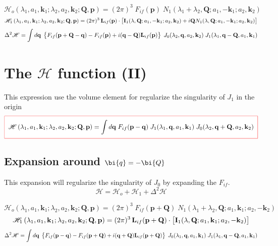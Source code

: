 \begin{equation}\label{Q:Hb}
\mathcal{H}_{o} \left( \lambda_{1},a_{1},\bm{k}_{1} ; \lambda_{2},
a_{2}, \bm{k}_{2} ; \bm{Q}, \bm{p} \right) = (2 \pi)^{3} \;
F_{if}(\bm{p}) \; N_{1} \left(\lambda_{1}+\lambda_{2}, \bm{Q} ; a_{1},
- \bm{k}_{1} ; a_{2}, \bm{k}_{2} \right)
\end{equation}
%
\[
\mathcal{H}_{1}\left( \lambda_{1},a_{1},\bm{k}_{1} ; \lambda_{2},
a_{2}, \bm{k}_{2}; \bm{Q}, \bm{p} \right)= (2 \pi)^{3} \, \bm{L}_{if}
(\bm{p}) \cdot  \left[ \bm{I}_{1}(\lambda,\bm{Q}; a_{1}, -\bm{k}_{1};
a_{2}, \bm{k}_{2} ) + i \bm{Q} N_{1}(\lambda,\bm{Q} ;
a_{1},-\bm{k}_{1} ; a_{2},\bm{k}_{2}) \vstretch \right]
\]
%
\[
\Delta^{2} \mathcal{H} = \int d \bm{q} \; \left\{ F_{if}( \bm{p} +
\bm{Q} - \bm{q} ) - F_{if}(\bm{p}) + i (\bm{q}-\bm{Q})
\bm{L}_{if}(\bm{p}) \vstretch\right\} \;
 J_{0}( \lambda_{2}, \bm{q} , a_{2}, \bm{k}_{2} ) \;
 J_{1}( \lambda_{1}, \bm{q} - \bm{Q}, a_{1}, \bm{k}_{1} )
\]

\section{The $\mathcal{H}$ function (II)}
This expression use the volume element for regularize the singularity
of $J_{1}$ in the origin
%
\[
  \fbeq{
\mathcal{H} \left( \lambda_{1},a_{1},\bm{k}_{1} ; \lambda_{2},a_{2},
\bm{k}_{2}; \bm{Q}, \bm{p} \right) = \int d \bm{q} \; F_{if}( \bm{p}
- \bm{q} ) \;
 J_{1}( \lambda_{1}, \bm{q}, a_{1}, \bm{k}_{1} )\;
 J_{0}( \lambda_{2}, \bm{q} + \bm{Q}, a_{2}, \bm{k}_{2} )
  }
\]

\subsection{Expansion around $\bi{q} = - \bi{Q}$}
This expansion will regularize the singularity of $J_{0}$ by expanding
the $F_{if}$.
\[
\mathcal{H} = \mathcal{H}_{o} + \mathcal{H}_{1} + \Delta^{2}
\mathcal{H}
\]

\begin{equation}\label{QR:Hc}
\mathcal{H}_{o} \left( \lambda_{1},a_{1},\bm{k}_{1} ; \lambda_{2},
a_{2}, \bm{k}_{2} ; \bm{Q}, \bm{p} \right) = (2 \pi)^{3} \;
F_{if}(\bm{p} + \bm{Q}) \; N_{1} \left(\lambda_{1}+\lambda_{2}, \bm{Q}
; a_{1}, \bm{k}_{1} ; a_{2}, - \bm{k}_{2} \right)
\end{equation}
%
\[
\mathcal{H}_{1}\left( \lambda_{1},a_{1},\bm{k}_{1} ; \lambda_{2},
a_{2}, \bm{k}_{2}; \bm{Q}, \bm{p} \right)= (2 \pi)^{3} \, \bm{L}_{if}
(\bm{p} + \bm{Q}) \cdot  \left[ \bm{I}_{1}(\lambda,\bm{Q};
a_{1},\bm{k}_{1}; a_{2},-\bm{k}_{2} )  \vstretch \right]
\]
%
\[
\Delta^{2} \mathcal{H} = \int d \bm{q} \; \left\{ F_{if}( \bm{p} -
\bm{q} ) - F_{if}(\bm{p} + \bm{Q}) + i (\bm{q}+\bm{Q})
\bm{L}_{if}(\bm{p} + \bm{Q}) \vstretch\right\} \;
 J_{0}( \lambda_{1}, \bm{q} , a_{1}, \bm{k}_{1} ) \;
 J_{1}( \lambda_{1}, \bm{q} - \bm{Q}, a_{1}, \bm{k}_{1} )
\]

